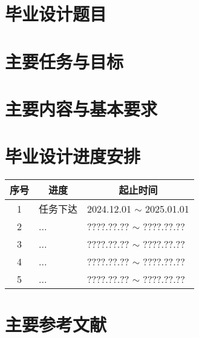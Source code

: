 \section{毕业设计题目}

\makeatletter
\@title %
\makeatother

\section{主要任务与目标}

\lipsum[2-3]

\section{主要内容与基本要求}

\lipsum[4-7]

\section{毕业设计进度安排}

\begin{table}[!htbp]
    \centering
    \vspace{-2ex}
    \small%
    \begin{tabular}{cp{25em}p{10.5em}}
        \toprule
        \textbf{序号} & \multicolumn{1}{c}{\textbf{进度}} & \multicolumn{1}{c}{\textbf{起止时间}} \\
        \midrule
        1 & 任务下达 & 2024.12.01 $\sim$ 2025.01.01 \\
        2 & ... & ????.??.?? $\sim$ ????.??.?? \\
        3 & ... & ????.??.?? $\sim$ ????.??.?? \\
        4 & ... & ????.??.?? $\sim$ ????.??.?? \\
        5 & ... & ????.??.?? $\sim$ ????.??.?? \\
        \bottomrule
    \end{tabular}
    \vspace{-2ex}
\end{table}

\section{主要参考文献\cite{chen2005zhulu,chu2004tushu,yuan2012lanc,lamport1986document,niu2013zonghe}}

